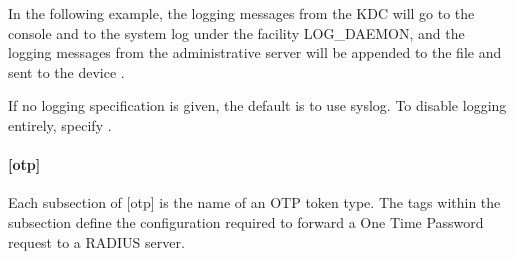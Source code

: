 \documentclass[letterpaper,10pt,english]{sphinxmanual}
\begin{document}
\sphinxAtStartPar
In the following example, the logging messages from the KDC will go to
the console and to the system log under the facility LOG\_DAEMON, and
the logging messages from the administrative server will be appended
to the file  and sent to the device
.

\begin{sphinxVerbatim}[commandchars=\\\{\}]
\PYG{p}{[}\PYG{p}{]}
      
      
      
      
\end{sphinxVerbatim}

\sphinxAtStartPar
If no logging specification is given, the default is to use syslog.
To disable logging entirely, specify .


\paragraph{{[}otp{]}}
\label{\detokenize{admin/conf_files/kdc_conf:otp}}\label{\detokenize{admin/conf_files/kdc_conf:id5}}
\sphinxAtStartPar
Each subsection of {[}otp{]} is the name of an OTP token type.  The tags
within the subsection define the configuration required to forward a
One Time Password request to a RADIUS server.
\end{document}
